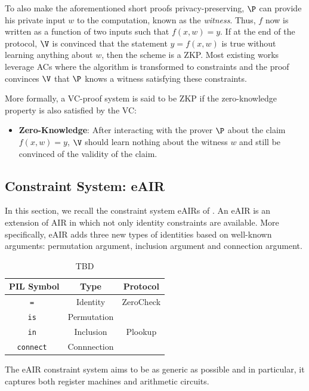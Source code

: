 To also make the aforementioned short proofs privacy-preserving, $\P$ can provide his private input $w$ to the computation, known as the \textit{witness}. Thus, $f$ now is written as a function of two inputs such that $f(x,w) = y$. If at the end of the protocol, $\V$ is convinced that the statement $y = f(x,w)$ is true without learning anything about $w$, then the scheme is a ZKP. Most existing works leverage ACs where the algorithm is transformed to constraints and the proof convinces $\V$ that $\P$ knows a witness satisfying these constraints. 

More formally, a VC-proof system is said to be ZKP if the zero-knowledge property is also satisfied by the VC:
\begin{itemize}
\item \textbf{Zero-Knowledge}: After interacting with the prover $\P$ about the claim $f(x,w) = y$, $\V$ should learn nothing about the witness $w$ and still be convinced of the validity of the claim.
\end{itemize}

\subsection{Constraint System: eAIR}

In this section, we recall the constraint system eAIRs of \cite{eSTARK}. An eAIR is an extension of AIR in which not only identity constraints are available. More specifically, eAIR adds three new types of identities based on well-known arguments: permutation argument, inclusion argument and connection argument. 

\begin{table}[H]
\centering
\begin{tabular}{|c|c|c|}
\hline
\textbf{PIL Symbol} & \textbf{Type} & \textbf{Protocol} \\\hline
\tt{=} & Identity & ZeroCheck \\\hline
\tt{is} & Permutation & \cite{EPRINT:GabWilCio19} \\\hline
\tt{in} & Inclusion & Plookup \cite{EPRINT:GabWil20} \\\hline
\tt{connect} & Connnection & \cite{EPRINT:GabWilCio19} \\\hline
\end{tabular}
\caption{TBD}
\label{fig:TBDDD}
\end{table}

The eAIR constraint system aims to be as generic as possible and in particular, it captures both register machines and arithmetic circuits.

